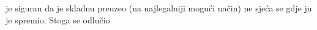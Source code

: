 \documentclass{exam}
\begin{document}
                                                                                                                                je
                                                                                                                                siguran
                                                                                                                                da
                                                                                                                                je
                                                                                                                                skladnu
                                                                                                                                preuzeo
                                                                                                                                (na
                                                                                                                                najlegalniji
                                                                                                                                mogući
                                                                                                                                način)
                                                                                                                                ne
                                                                                                                                sjeća
                                                                                                                                se
                                                                                                                                gdje
                                                                                                                                ju
                                                                                                                                je
                                                                                                                                spremio.
                                                                                                                                Stoga
                                                                                                                                se
                                                                                                                                odlučio
\end{document}
